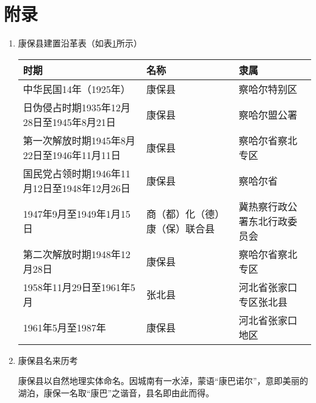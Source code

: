 \section*{附录}
\begin{enumerate}
    \item 康保县建置沿革表（如表\ref{tab:part1-12-JianZhiYanGeTable}所示）
    \begin{table}[ht]
        \centering
        \begin{tabular}{p{}<{\centering}p{}<{\centering}p{}<{\centering}}
            \toprule[1.5pt]
            时期                             & 名称              & 隶属             \\
            \midrule[0.75pt]
            中华民国14年（1925年）                 & 康保县             & 察哈尔特别区         \\
            日伪侵占时期1935年12月28日至1945年8月21日   & 康保县             & 察哈尔盟公署         \\
            第一次解放时期1945年8月22日至1946年11月11日  & 康保县             & 察哈尔省察北专区       \\
            国民党占领时期1946年11月12日至1948年12月26日 & 康保县             & 察哈尔省           \\
            1947年9月至1949年1月15日             & 商（都）化（德）康（保）联合县 & 冀热察行政公署东北行政委员会 \\
            第二次解放时期1948年12月28日             & 康保县             & 察哈尔省察北专区       \\
            1958年11月29日至1961年5月            & 张北县             & 河北省张家口专区张北县    \\
            1961年5月至1987年                  & 康保县             & 河北省张家口地区      \\
            \bottomrule[1.5pt]
        \end{tabular}
        \label{tab:part1-12-JianZhiYanGeTable}
    \end{table}
    \newpage
    \item 康保县名来历考
    
    康保县以自然地理实体命名。因城南有一水淖，蒙语“康巴诺尔”，意即美丽的湖泊，康保一名取“康巴”之谐音，县名即由此而得。
\end{enumerate}